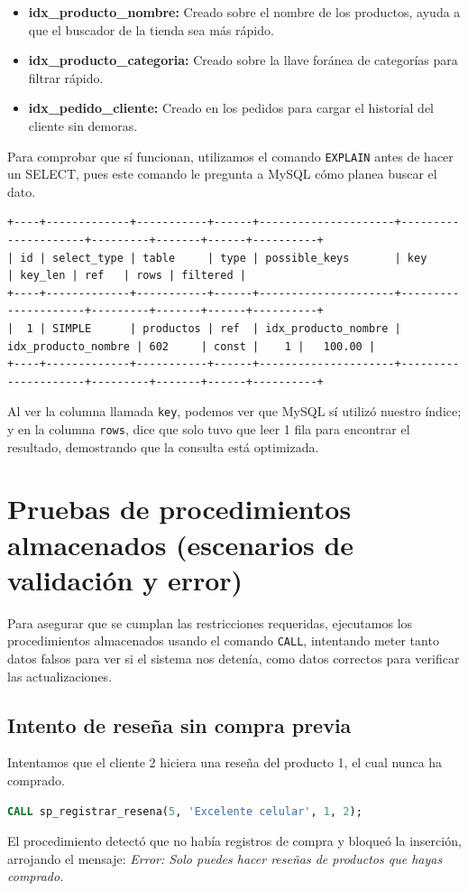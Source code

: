 \documentclass[10pt,letterpaper]{article}
\begin{document}
\begin{itemize}
    \item \textbf{idx\_producto\_nombre:} Creado sobre el nombre de los productos, ayuda a que el buscador de la tienda sea m\'as r\'apido.
    \item \textbf{idx\_producto\_categoria:} Creado sobre la llave for\'anea de categor\'ias para filtrar r\'apido.
    \item \textbf{idx\_pedido\_cliente:} Creado en los pedidos para cargar el historial del cliente sin demoras.
\end{itemize}

Para comprobar que s\'i funcionan, utilizamos el comando \texttt{EXPLAIN} antes de hacer un SELECT, pues este comando le pregunta a MySQL c\'omo planea buscar el dato.

\begin{verbatim}
+----+-------------+-----------+------+---------------------+---------------------+---------+-------+------+----------+
| id | select_type | table     | type | possible_keys       | key                 | key_len | ref   | rows | filtered |
+----+-------------+-----------+------+---------------------+---------------------+---------+-------+------+----------+
|  1 | SIMPLE      | productos | ref  | idx_producto_nombre | idx_producto_nombre | 602     | const |    1 |   100.00 |
+----+-------------+-----------+------+---------------------+---------------------+---------+-------+------+----------+
\end{verbatim}

Al ver la columna llamada \texttt{key}, podemos ver que MySQL s\'i utiliz\'o nuestro \'indice; y en la columna \texttt{rows}, dice que solo tuvo que leer 1 fila para encontrar el resultado, demostrando que la consulta est\'a optimizada.


\section{Pruebas de procedimientos almacenados (escenarios de validaci\'on y error)}
Para asegurar que se cumplan las restricciones requeridas, ejecutamos los procedimientos almacenados usando el comando \texttt{CALL}, intentando meter tanto datos falsos para ver si el sistema nos deten\'ia, como datos correctos para verificar las actualizaciones.

\subsection{Intento de rese\~na sin compra previa}
Intentamos que el cliente 2 hiciera una rese\~na del producto 1, el cual nunca ha comprado.
\begin{lstlisting}[language=SQL, frame=single, caption={Error por falta de compra}]
CALL sp_registrar_resena(5, 'Excelente celular', 1, 2);
\end{lstlisting}
El procedimiento detect\'o que no hab\'ia registros de compra y bloque\'o la inserci\'on, arrojando el mensaje: \textit{Error: Solo puedes hacer rese\~nas de productos que hayas comprado.}
\end{document}
